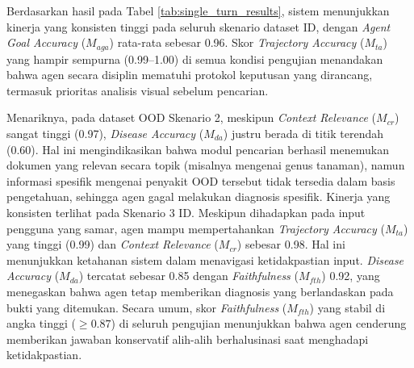 Berdasarkan hasil pada Tabel \ref{tab:single_turn_results}, sistem menunjukkan kinerja yang konsisten tinggi pada seluruh skenario dataset ID, dengan \textit{Agent Goal Accuracy} ($M_{aga}$) rata-rata sebesar 0.96. Skor \textit{Trajectory Accuracy} ($M_{ta}$) yang hampir sempurna (0.99--1.00) di semua kondisi pengujian menandakan bahwa agen secara disiplin mematuhi protokol keputusan yang dirancang, termasuk prioritas analisis visual sebelum pencarian.

Menariknya, pada dataset OOD Skenario 2, meskipun \textit{Context Relevance} ($M_{cr}$) sangat tinggi (0.97), \textit{Disease Accuracy} ($M_{da}$) justru berada di titik terendah (0.60). Hal ini mengindikasikan bahwa modul pencarian berhasil menemukan dokumen yang relevan secara topik (misalnya mengenai genus tanaman), namun informasi spesifik mengenai penyakit OOD tersebut tidak tersedia dalam basis pengetahuan, sehingga agen gagal melakukan diagnosis spesifik. Kinerja yang konsisten terlihat pada Skenario 3 ID. Meskipun dihadapkan pada input pengguna yang samar, agen mampu mempertahankan \textit{Trajectory Accuracy} ($M_{ta}$) yang tinggi (0.99) dan \textit{Context Relevance} ($M_{cr}$) sebesar 0.98. Hal ini menunjukkan ketahanan sistem dalam menavigasi ketidakpastian input. \textit{Disease Accuracy} ($M_{da}$) tercatat sebesar 0.85 dengan \textit{Faithfulness} ($M_{fth}$) 0.92, yang menegaskan bahwa agen tetap memberikan diagnosis yang berlandaskan pada bukti yang ditemukan. Secara umum, skor \textit{Faithfulness} ($M_{fth}$) yang stabil di angka tinggi ($\geq 0.87$) di seluruh pengujian menunjukkan bahwa agen cenderung memberikan jawaban konservatif alih-alih berhalusinasi saat menghadapi ketidakpastian.


